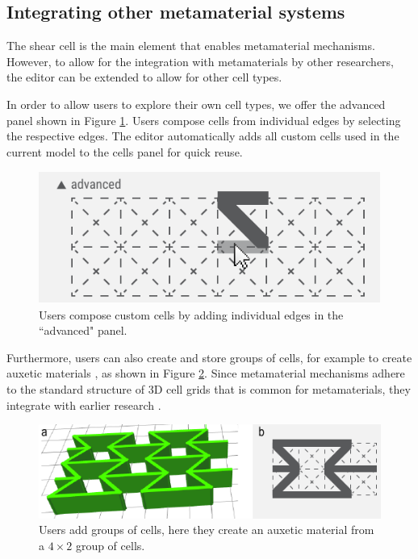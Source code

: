 \subsection{Integrating other metamaterial systems}

The shear cell is the main element that enables metamaterial mechanisms. However, to allow for the integration with metamaterials by other researchers, the editor can be extended to allow for other cell types. 

In order to allow users to explore their own cell types, we offer the advanced panel shown in Figure \ref{fig:24-advanced-cell-builder}. Users compose cells from individual edges by selecting the respective edges. The editor automatically adds all custom cells used in the current model to the cells panel for quick reuse. 

\begin{figure} [h]
    \includegraphics[width=\textwidth]{chapters/metamaterial-mechanisms-FIG/24-advanced-cell-builder.pdf}
    \caption[Short figure name.]{Users compose custom cells by adding individual edges in the ``advanced" panel.
    \label{fig:24-advanced-cell-builder}}
\end{figure}

Furthermore, users can also create and store groups of cells, for example to create auxetic materials \cite{Saxena2016}, as shown in Figure \ref{fig:25-advanced-cell-groups}. Since metamaterial mechanisms adhere to the standard structure of 3D cell grids that is common for metamaterials, they integrate with earlier research \cite{Panetta2015, Schumacher2015}.

\begin{figure} [h]
    \includegraphics[width=\textwidth]{chapters/metamaterial-mechanisms-FIG/25-advanced-cell-groups.pdf}
    \caption[Short figure name.]{Users add groups of cells, here they create an auxetic material from a $4 \times 2$ group of cells.
    \label{fig:25-advanced-cell-groups}}
\end{figure}


